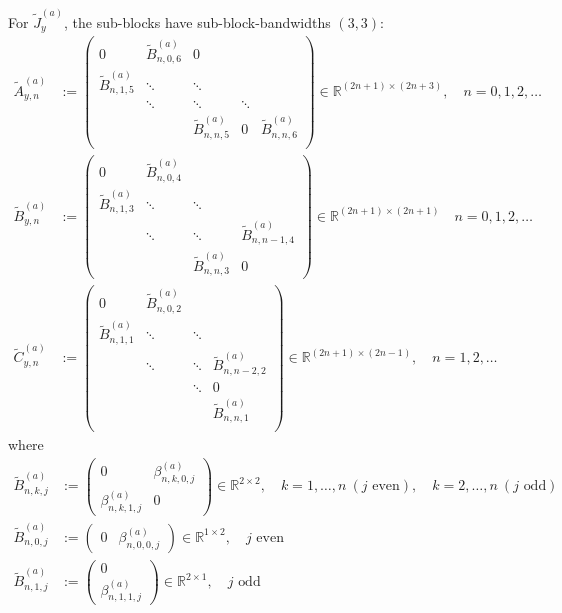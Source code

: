 \documentclass[11pt, oneside]{article}   	%
\newcommand{\R}{\mathbb{R}}
\newcommand{\betaa}{\beta^{(a)}}
\begin{document}
For $\tilde J_y^{(a)}$, the sub-blocks have sub-block-bandwidths $(3,3)$:
\begin{align*}
	\tilde A^{(a)}_{y,n} &:= 
		\begin{pmatrix}
			0 & \tilde B^{(a)}_{n,0,6} & 0 & & \\
			\tilde B^{(a)}_{n,1,5} & \ddots & \ddots & & \\
			& \ddots & \ddots & \ddots & \\
			& & \tilde B^{(a)}_{n,n,5} & 0 & \tilde B^{(a)}_{n,n,6} \\
		\end{pmatrix} \in \R^{(2n+1)\times(2n+3)}, \quad n = 0,1,2,\dots \\
	\tilde B^{(a)}_{y,n} &:= 
		\begin{pmatrix}
			0 & \tilde B^{(a)}_{n,0,4} & & \\
			\tilde B^{(a)}_{n,1,3} & \ddots & \ddots & \\
			& \ddots & \ddots & \tilde B^{(a)}_{n,n-1,4} \\
			& & \tilde B^{(a)}_{n,n,3} & 0
		\end{pmatrix} \in \R^{(2n+1)\times(2n+1)}  \quad n = 0,1,2,\dots \\
	\tilde C^{(a)}_{y,n} &:= 
		\begin{pmatrix}
			0 & \tilde B^{(a)}_{n,0,2} & & \\
			\tilde B^{(a)}_{n,1,1} & \ddots & \ddots & \\
			& \ddots & \ddots & \tilde B^{(a)}_{n,n-2,2} \\
			& & \ddots & 0 \\
			& & & \tilde B^{(a)}_{n,n,1} \\
		\end{pmatrix} \in \R^{(2n+1)\times(2n-1)}, \quad n = 1,2,\dots
\end{align*}
where
\begin{align*}
	\tilde B^{(a)}_{n,k,j} &:= 
		\begin{pmatrix}
			0 & \betaa_{n,k,0,j} \\
			\betaa_{n,k,1,j} & 0
		\end{pmatrix} \in \R^{2\times2}, \quad k = 1,\dots,n \: (j \text{ even}), \quad k = 2,\dots,n \: (j \text{ odd}) \\
	\tilde B^{(a)}_{n,0,j} &:=
		\begin{pmatrix}
			0 & \betaa_{n,0,0,j}
		\end{pmatrix} \in \R^{1\times2}, \quad j \text{ even} \\
	\tilde B^{(a)}_{n,1,j} &:=
		\begin{pmatrix}
			0 \\
			\betaa_{n,1,1,j}
		\end{pmatrix} \in \R^{2\times1}, \quad j \text{ odd} \\
\end{align*}
\end{document}
